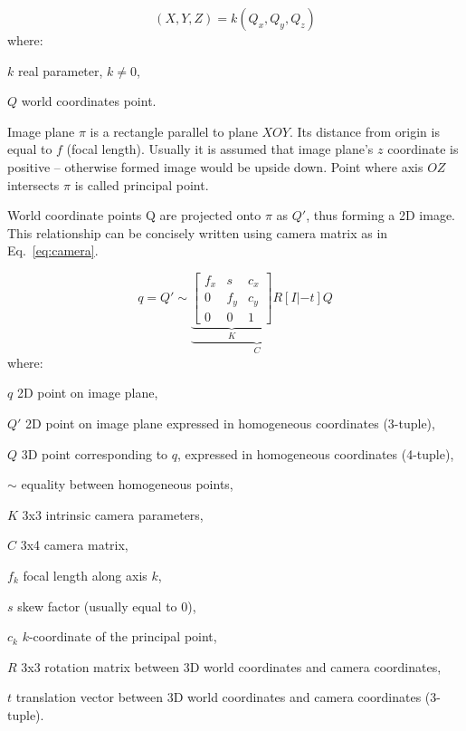 \begin{equation}
(X, Y, Z) = k(Q_x, Q_y, Q_z)
\label{eq:homo}
\end{equation}
where:
\begin{eqwhere}[2cm]
	\item[$k$] real parameter, \(k \neq 0\),
	\item[$Q$] world coordinates point.
\end{eqwhere}

Image plane \(\pi\) is a rectangle parallel to plane \(XOY\). Its distance from origin is equal to \(f\) (focal length). Usually it is assumed that image plane's \(z\) coordinate is positive -- otherwise formed image would be upside down. Point where axis \(OZ\) intersects \(\pi\) is called principal point.

World coordinate points Q are projected onto \(\pi\) as \(Q'\), thus forming a 2D image. This relationship can be concisely written using camera matrix as in Eq.~\ref{eq:camera}.

\begin{equation}
q = Q' \sim \underbrace{ \underbrace{  \begin{bmatrix}
		f_{x} & s & c_{x} \\ 
		0 & f_{y} & c_{y} \\ 
		0 & 0 & 1
	\end{bmatrix}
}_{K} R \left [ I | -t \right ] }_{C} Q
\label{eq:camera}
\end{equation}
where:
\begin{eqwhere}[2cm]
	\item[$q$] 2D point on image plane,
	\item[$Q'$] 2D point on image plane expressed in homogeneous coordinates (3-tuple),
	\item[$Q$] 3D point corresponding to $q$, expressed in homogeneous coordinates (4-tuple),
	\item[$\sim$] equality between homogeneous points,
	\item[$K$] 3x3 intrinsic camera parameters,
	\item[$C$] 3x4 camera matrix,
	\item[$f_{k}$] focal length along axis $k$,
	\item[$s$] skew factor (usually equal to 0),
	\item[$c_{k}$] $k$-coordinate of the principal point,
	\item[$R$] 3x3 rotation matrix between 3D world coordinates and camera coordinates,
	\item[$t$] translation vector between 3D world coordinates and camera coordinates (3-tuple).
\end{eqwhere}

